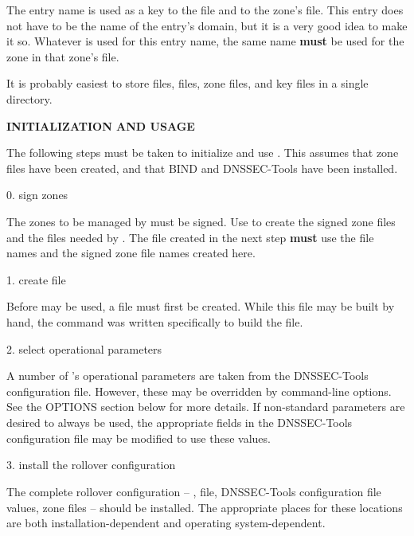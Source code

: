 The  entry name is used as a key to the  file
and to the zone's  file.  This entry does not have to be the
name of the entry's domain, but it is a very good idea to make it so.
Whatever is used for this entry name, the same name {\bf must} be used for the
zone  in that zone's  file.

It is probably easiest to store  files,  files,
zone files, and key files in a single directory.

{\bf INITIALIZATION AND USAGE}

The following steps must be taken to initialize and use .  This
assumes that zone files have been created, and that BIND and DNSSEC-Tools have
been installed.

\begin{description}

\item 0. sign zones\verb" "

The zones to be managed by  must be signed.  Use 
to create the signed zone files and the  files needed by
.  The  file created in the next step {\bf must}
use the  file names and the signed zone file names created
here.

\item 1. create  file\verb" "

Before  may be used, a  file must first be
created.  While this file may be built by hand, the  command
was written specifically to build the file.

\item 2. select operational parameters\verb" "

A number of 's operational parameters are taken from the
DNSSEC-Tools configuration file.  However, these may be overridden
by command-line options.  See the OPTIONS section below for more details.
If non-standard parameters are desired to always be used, the appropriate
fields in the DNSSEC-Tools configuration file may be modified to use these
values.

\item 3. install the rollover configuration\verb" "

The complete rollover configuration -- ,  file,
DNSSEC-Tools configuration file values, zone files -- should be installed.  
The appropriate places for these locations are both installation-dependent
and operating system-dependent.


\end{description}
